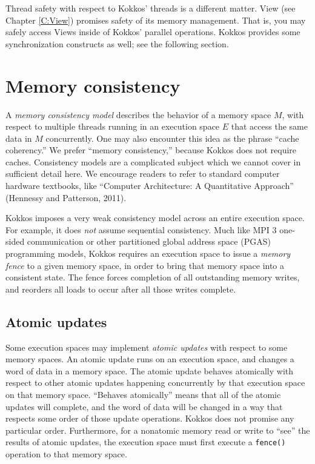 Thread safety with respect to Kokkos' threads is a different matter.
View (see Chapter \ref{C:View}) promises safety of its memory management.
That is, you may safely access Views inside of Kokkos' parallel operations.
Kokkos provides some synchronization constructs as well; see the following section.

\section{Memory consistency}\label{S:Model:Consistency}

A \emph{memory consistency model} describes the behavior of a memory space $M$,
with respect to multiple threads running in an execution space $E$
that access the same data in $M$ concurrently.
One may also encounter this idea as the phrase ``cache coherency.''
We prefer ``memory consistency,'' because Kokkos does not require caches.
Consistency models are a complicated subject which we cannot cover in sufficient detail here.
We encourage readers to refer to standard computer hardware textbooks,
like ``Computer Architecture: A Quantitative Approach'' (Hennessy and Patterson, 2011).

Kokkos imposes a very weak consistency model across an entire execution space.
For example, it does \emph{not} assume sequential consistency.
Much like MPI 3 one-sided communication
or other partitioned global address space (PGAS) programming models,
Kokkos requires an execution space to issue a \emph{memory fence}
to a given memory space, 
in order to bring that memory space into a consistent state.
The fence forces completion of all outstanding memory writes,
and reorders all loads to occur after all those writes complete.

\subsection{Atomic updates}\label{SS:Model:Consistency:Atomic}

Some execution spaces may implement \emph{atomic updates} with respect to some memory spaces.
An atomic update runs on an execution space, and changes a word of data in a memory space.
The atomic update behaves atomically with respect to other atomic updates happening concurrently by that execution space on that memory space.
``Behaves atomically'' means that all of the atomic updates will complete,
and the word of data will be changed in a way that respects some order of those update operations.
Kokkos does not promise any particular order.
Furthermore, for a nonatomic memory read or write to ``see'' the results of atomic updates,
the execution space must first execute a \lstinline!fence()! operation to that memory space.
